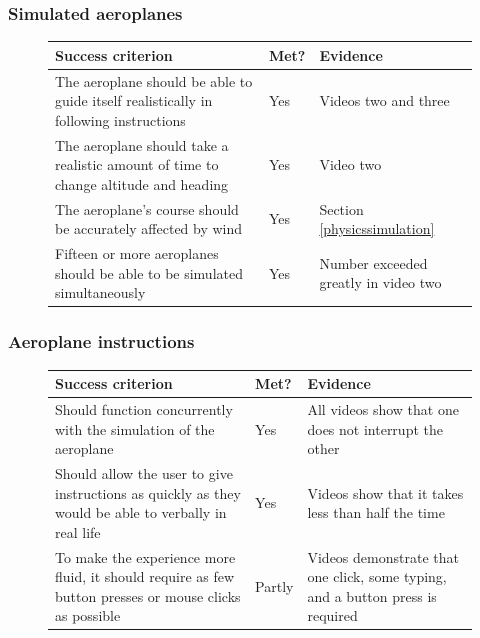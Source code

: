 \documentclass{article}
\begin{document}
\subsubsection{Simulated aeroplanes}
\begin{figure}[H]
\centering
\begin{tabular}{| p{} | p{} | p{} |}
\hline
\textbf{Success criterion} & \textbf{Met?} & \textbf{Evidence} \\
\hline
The aeroplane should be able to guide itself realistically in following instructions & Yes & Videos two and three \\
\hline
The aeroplane should take a realistic amount of time to change altitude and heading & Yes & Video two \\
\hline
The aeroplane's course should be accurately affected by wind & Yes & Section \ref{physicssimulation} \\
\hline
Fifteen or more aeroplanes should be able to be simulated simultaneously & Yes & Number exceeded greatly in video two \\
\hline
\end{tabular}
\end{figure}

\subsubsection{Aeroplane instructions}\label{aeroplaneinstructionssuccess}
\begin{figure}[H]
\centering
\begin{tabular}{| p{} | p{} | p{} |}
\hline
\textbf{Success criterion} & \textbf{Met?} & \textbf{Evidence} \\
\hline
Should function concurrently with the simulation of the aeroplane & Yes & All videos show that one does not interrupt the other \\
\hline
Should allow the user to give instructions as quickly as they would
be able to verbally in real life & Yes & Videos show that it takes less than half the time \\
\hline
To make the experience more fluid, it should require as few button presses or mouse
clicks as possible & Partly & Videos demonstrate that one click, some typing, and a button press is required \\
\hline
\end{tabular}
\end{figure}
\end{document}
